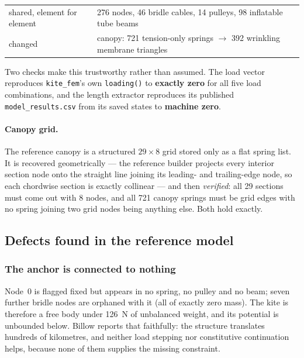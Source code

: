 \documentclass[11pt,a4paper]{article}
\begin{document}
\begin{center}
\begin{tabular}{ll}
\toprule
shared, element for element & 276 nodes, 46 bridle cables, 14 pulleys,
                              98 inflatable tube beams \\
changed & canopy: 721 tension-only springs $\rightarrow$ 392 wrinkling
          membrane triangles \\
\bottomrule
\end{tabular}
\end{center}

Two checks make this trustworthy rather than assumed. The load vector
reproduces \texttt{kite\_fem}'s own \texttt{loading()} to \textbf{exactly zero}
for all five load combinations, and the length extractor reproduces its
published \texttt{model\_results.csv} from its saved states to
\textbf{machine zero}.

\paragraph{Canopy grid.} The reference canopy is a structured $29\times8$ grid
stored only as a flat spring list. It is recovered geometrically --- the
reference builder projects every interior section node onto the straight line
joining its leading- and trailing-edge node, so each chordwise section is
exactly collinear --- and then \emph{verified}: all 29 sections must come out
with 8 nodes, and all 721 canopy springs must be grid edges with no spring
joining two grid nodes being anything else. Both hold exactly.

\subsection{Defects found in the reference model}

\subsubsection{The anchor is connected to nothing}

Node~0 is flagged fixed but appears in no spring, no pulley and no beam; seven
further bridle nodes are orphaned with it (all of exactly zero mass). The kite
is therefore a free body under \SI{126}{N} of unbalanced weight, and its
potential is unbounded below. Billow reports that faithfully: the structure
translates hundreds of kilometres, and neither load stepping nor constitutive
continuation helps, because none of them supplies the missing constraint.
\end{document}
